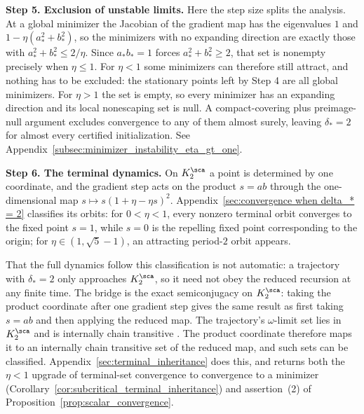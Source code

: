 \documentclass{article}
\begin{document}
\textbf{Step 5. Exclusion of unstable limits.}
Here the step size splits the analysis. At a global minimizer the
Jacobian of the gradient map has the eigenvalues $1$ and
$1-\eta(a_\ast^2+b_\ast^2)$, so the minimizers with no expanding direction are
exactly those with $a_\ast^2+b_\ast^2\le2/\eta$. Since $a_\ast b_\ast=1$ forces
$a_\ast^2+b_\ast^2\ge2$, that set is nonempty precisely when $\eta\le1$. For
$\eta<1$ some minimizers can therefore still attract, and nothing has to be
excluded: the stationary points left by Step 4 are all global minimizers. For
$\eta>1$ the set is empty, so every minimizer has an expanding direction and
its local nonescaping set is null. A compact-covering plus preimage-null
argument excludes convergence to any of them almost surely, leaving
$\delta_\ast=2$ for almost every certified initialization. See
Appendix~\ref{subsec:minimizer_instability_eta_gt_one}.

\textbf{Step 6. The terminal dynamics.}
On $K_2^\sca$ a point is determined by one coordinate, and the gradient step
acts on the product $s=ab$ through the
one-dimensional map $s\mapsto s(1+\eta-\eta s)^2$.
Appendix~\ref{sec:convergence when delta_* = 2} classifies its orbits: for
$0<\eta<1$, every nonzero terminal orbit converges to the fixed point $s=1$,
while $s=0$ is the repelling fixed point corresponding to the origin; for
$\eta\in(1,\sqrt5-1)$, an attracting period-$2$ orbit appears.

That the full dynamics follow this classification is not automatic: a
trajectory with $\delta_\ast=2$ only approaches $K_2^\sca$, so it need not obey
the reduced recursion at any finite time. The bridge is the exact semiconjugacy
on $K_2^\sca$: taking the product coordinate after one gradient step gives the
same result as first taking $s=ab$ and then applying the reduced map. The
trajectory's $\omega$-limit set lies in $K_2^\sca$ and is internally chain
transitive \citep{hirsch2001chain}. The product coordinate therefore maps it to
an internally chain transitive set of the reduced map, and such sets
can be classified.
Appendix~\ref{sec:terminal_inheritance} does this, and returns both the
$\eta<1$ upgrade of terminal-set convergence to convergence to a minimizer
(Corollary~\ref{cor:subcritical_terminal_inheritance}) and assertion~(2) of
Proposition~\ref{prop:scalar_convergence}.
\end{document}
